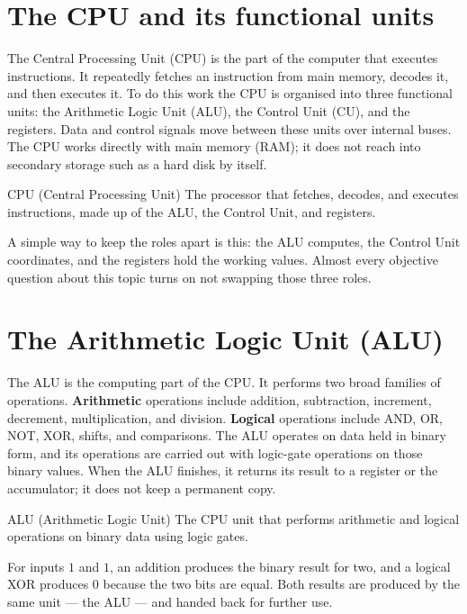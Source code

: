 \section{The CPU and its functional units}
The Central Processing Unit (CPU) is the part of the computer that executes
instructions. It repeatedly fetches an instruction from main memory, decodes
it, and then executes it. To do this work the CPU is organised into three
functional units: the Arithmetic Logic Unit (ALU), the Control Unit (CU),
and the registers. Data and control signals move between these units over
internal buses. The CPU works directly with main memory (RAM); it does not
reach into secondary storage such as a hard disk by itself.

\begin{definitionbox}{CPU (Central Processing Unit)}
The processor that fetches, decodes, and executes instructions, made up of
the ALU, the Control Unit, and registers.
\end{definitionbox}

A simple way to keep the roles apart is this: the ALU computes, the Control
Unit coordinates, and the registers hold the working values. Almost every
objective question about this topic turns on not swapping those three roles.

\section{The Arithmetic Logic Unit (ALU)}
The ALU is the computing part of the CPU. It performs two broad families of
operations. \textbf{Arithmetic} operations include addition, subtraction,
increment, decrement, multiplication, and division. \textbf{Logical}
operations include AND, OR, NOT, XOR, shifts, and comparisons. The ALU
operates on data held in binary form, and its operations are carried out with
logic-gate operations on those binary values. When the ALU finishes, it
returns its result to a register or the accumulator; it does not keep a
permanent copy.

\begin{definitionbox}{ALU (Arithmetic Logic Unit)}
The CPU unit that performs arithmetic and logical operations on binary data
using logic gates.
\end{definitionbox}

\begin{example}
For inputs $1$ and $1$, an addition produces the binary result for two, and
a logical XOR produces $0$ because the two bits are equal. Both results are
produced by the same unit --- the ALU --- and handed back for further use.
\end{example}

